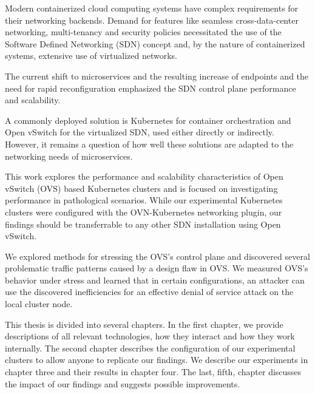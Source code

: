 


Modern containerized cloud computing systems have complex requirements for their networking backends. Demand for features like seamless cross-data-center networking, multi-tenancy and security policies necessitated the use of the Software Defined Networking (SDN) concept and, by the nature of containerized systems, extensive use of virtualized networks.

The current shift to microservices and the resulting increase of endpoints and the need for rapid reconfiguration emphasized the SDN control plane performance and scalability.

A commonly deployed solution is Kubernetes for container orchestration and Open vSwitch for the virtualized SDN, used either directly or indirectly. However, it remains a question of how well these solutions are adapted to the networking needs of microservices.

This work explores the performance and scalability characteristics of Open vSwitch (OVS) based Kubernetes clusters and is focused on investigating performance in pathological scenarios. While our experimental Kubernetes clusters were configured with the OVN-Kubernetes networking plugin, our findings should be transferrable to any other SDN installation using Open vSwitch.

We explored methods for stressing the OVS's control plane and discovered several problematic traffic patterns caused by a design flaw in OVS. We measured OVS's behavior under stress and learned that in certain configurations, an attacker can use the discovered inefficiencies for an effective denial of service attack on the local cluster node.

This thesis is divided into several chapters. In the first chapter, we provide descriptions of all relevant technologies, how they interact and how they work internally. The second chapter describes the configuration of our experimental clusters to allow anyone to replicate our findings. We describe our experiments in chapter three and their results in chapter four. The last, fifth, chapter discusses the impact of our findings and suggests possible improvements.



%

